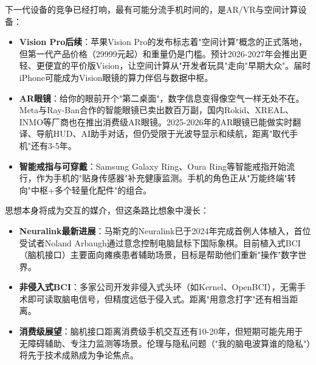 


下一代设备的竞争已经打响，最有可能分流手机时间的，是AR/VR与空间计算设备：

\begin{itemize}
  \item \textbf{Vision Pro后续}：苹果Vision Pro的发布标志着"空间计算"概念的正式落地，但第一代产品价格（29999元起）和重量仍是门槛。预计2026-2027年会推出更轻、更便宜的平价版Vision，让空间计算从"开发者玩具"走向"早期大众"。届时iPhone可能成为Vision眼镜的算力伴侣与数据中枢。
  \item \textbf{AR眼镜}：给你的眼前开个"第二桌面"，数字信息变得像空气一样无处不在。Meta与Ray-Ban合作的智能眼镜已卖出数百万副，国内Rokid、XREAL、INMO等厂商也在推出消费级AR眼镜。2025-2026年的AR眼镜已能做实时翻译、导航HUD、AI助手对话，但仍受限于光波导显示和续航，距离"取代手机"还有3-5年。
  \item \textbf{智能戒指与可穿戴}：Samsung Galaxy Ring、Oura Ring等智能戒指开始流行，作为手机的"贴身传感器"补充健康监测。手机的角色正从"万能终端"转向"中枢+多个轻量化配件"的组合。
\end{itemize}


思想本身将成为交互的媒介，但这条路比想象中漫长：

\begin{itemize}
  \item \textbf{Neuralink最新进展}：马斯克的Neuralink已于2024年完成首例人体植入，首位受试者Noland Arbaugh通过意念控制电脑鼠标下国际象棋。目前植入式BCI（脑机接口）主要面向瘫痪患者辅助场景，目标是帮助他们重新"操作"数字世界。
  \item \textbf{非侵入式BCI}：多家公司开发非侵入式头环（如Kernel、OpenBCI），无需手术即可读取脑电信号，但精度远低于侵入式。距离"用意念打字"还有相当距离。
  \item \textbf{消费级展望}：脑机接口距离消费级手机交互还有10-20年，但短期可能先用于无障碍辅助、专注力监测等场景。伦理与隐私问题（"我的脑电波算谁的隐私"）将先于技术成熟成为争论焦点。
\end{itemize}


